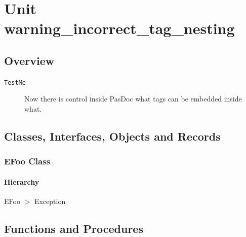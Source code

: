 \documentclass{report}
\begin{document}
\newlength{\tmplength}
\chapter{Unit warning{\_}incorrect{\_}tag{\_}nesting}
\section{Overview}
\begin{description}
\item[\texttt{\begin{ttfamily}EFoo\end{ttfamily} Class}]
\end{description}
\begin{description}
\item[\texttt{TestMe}]Now there is control inside PasDoc what tags can be embedded inside what.
\end{description}
\section{Classes, Interfaces, Objects and Records}
\subsection*{EFoo Class}
\subsubsection*{\large{\textbf{Hierarchy}}\normalsize\hspace{1ex}\hfill}
EFoo {$>$} Exception
\section{Functions and Procedures}
\end{document}
